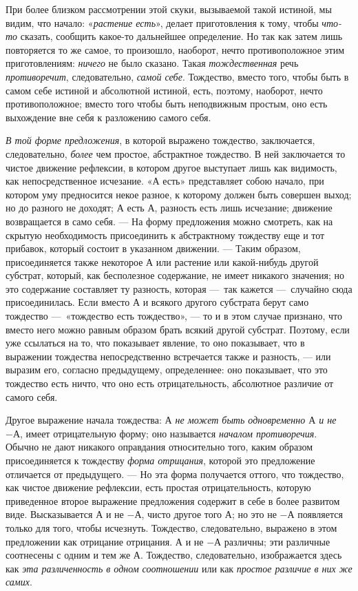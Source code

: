 При более близком рассмотрении этой скуки, вызываемой такой истиной, мы
видим, что начало: «{\em растение есть}», делает
приготовления к тому, чтобы {\em что-то} сказать,
сообщить какое-то дальнейшее определение. Но так как затем лишь повторяется
то же самое, то произошло, наоборот, нечто противоположное этим
приготовлениям: {\em ничего} не было сказано. Такая
{\em тождественная} речь
{\em противоречит}, следовательно,
{\em самой себе}. Тождество, вместо того, чтобы быть в
самом себе истиной и абсолютной истиной, есть, поэтому, наоборот, нечто
противоположное; вместо того чтобы быть неподвижным простым, оно есть
выхождение вне себя к разложению самого себя.

{\em В той форме предложения}, в которой выражено
тождество, заключается, следовательно, {\em более} чем
простое, абстрактное тождество. В ней заключается то чистое движение
рефлексии, в котором другое выступает лишь как видимость, как
непосредственное исчезание. «$А$ есть» представляет собою начало,
при котором уму предносится некое разное, к которому должен быть совершен
выход; но до разного не доходят; $А$ есть $А$, разность есть
лишь исчезание; движение возвращается в само себя. — На форму предложения
можно смотреть, как на скрытую необходимость присоединить к абстрактному
тождеству еще и тот прибавок, который состоит в указанном движении. — Таким
образом, присоединяется также некоторое $А$ или растение или
какой-нибудь другой субстрат, который, как бесполезное содержание, не имеет
никакого значения; но это содержание составляет ту разность, которая —~так
кажется —~случайно сюда присоединилась. Если вместо $А$ и всякого
другого субстрата берут само тождество —~«тождество есть тождество», — то и
в этом случае признано, что вместо него можно равным образом брать всякий
другой субстрат. Поэтому, если уже ссылаться на то, что показывает явление,
то оно показывает, что в выражении тождества непосредственно встречается
также и разность, — или выразим его, согласно предыдущему, определеннее:
оно показывает, что это тождество есть ничто, что оно есть отрицательность,
абсолютное различие от самого себя.

Другое выражение начала тождества: {\em $А$ не может быть
одновременно $А$ и не $-А$}, имеет отрицательную форму; оно называется
{\em началом противоречия}. Обычно не дают никакого
оправдания относительно того, каким образом присоединяется к тождеству
{\em форма отрицания}, которой это предложение
отличается от предыдущего. — Но эта форма получается оттого, что тождество,
как чистое движение рефлексии, есть простая отрицательность, которую
приведенное второе выражение предложения содержит в себе в более развитом
виде. Высказывается $А$ и не $-А$, чисто другое того
$А$; но это не $-А$ появляется только для того, чтобы
исчезнуть. Тождество, следовательно, выражено в этом предложении как
отрицание отрицания. $А$ и не $-А$ различны; эти различные
соотнесены с одним и тем же $А$. Тождество, следовательно,
изображается здесь как {\em эта различенность в одном
соотношении} или как {\em простое различие в них же
самих}.

